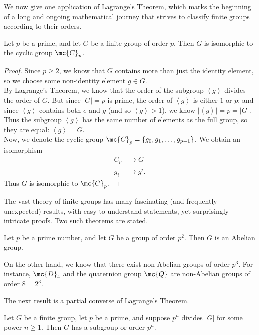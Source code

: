 \documentclass[math1530-lecture-notes]{subfiles}
\begin{document}
We now give one application of Lagrange's Theorem, which marks the beginning of a long and ongoing
mathematical journey that strives to classify finite groups according to their orders.
\begin{proposition}{}
  Let $p$ be a prime, and let $G$ be a finite group of order $p$. Then $G$ is isomorphic to the
  cyclic group $\mc{C}_p$.
\end{proposition}
\begin{proof}[Proof]
  Since $p\ge 2$, we know that $G$ contains more than just the identity element, so we choose some
  non-identity element $g\in G$. \\
  \indent By Lagrange's Theorem, we know that the order of the subgroup
  $\left<g \right>$ divides the order of $G$. But since $\left| G \right| = p$ is prime, the order of
  $\left<g \right>$ is either $1$ or $p$; and since $\left< g\right>$ contains both $e$ and $g$ (and
  so $\left<g \right> > 1$), we know $\left| \left<g \right> \right| =p=\left| G \right|$. Thus the
  subgroup $\left<g \right>$ has the same number of elements as the full group, so they are equal:
  $\left<g \right> = G$. \\
  Now, we denote the cyclic group $\mc{C}_p=\{ g_0,g_1,\ldots,g_{p-1} \}$. We obtain an isomorphism
  \begin{align*}
    C_p &\longrightarrow G \\
     g_i &\longmapsto g^{i}
  .\end{align*} Thus $G$ is isomorphic to $\mc{C}_p$.
\end{proof}

\begin{remark}
  The vast theory of finite groups has many fascinating (and frequently unexpected) results, with
  easy to understand statements, yet surprisingly intricate proofs. Two such theorems are stated.
\end{remark}

\begin{theorem}[]{}
  Let $p$ be a prime number, and let $G$ be a group of order $p^2$. Then $G$ is an Abelian group.
\end{theorem}

On the other hand, we know that there exist non-Abelian groups of order $p^3$. For instance,
$\mc{D}_4$ and the quaternion group $\mc{Q}$ are non-Abelian groups of order $8=2^3$.

The next result is a partial converse of  Lagrange's Theorem.
\begin{theorem}{}
  Let $G$ be a finite group, let $p$ be a prime, and suppose $p^{n}$ divides $\left| G \right| $ for
  some power $n\ge 1$. Then $G$ has a subgroup or order $p^{n}$.
\end{theorem}
\end{document}

